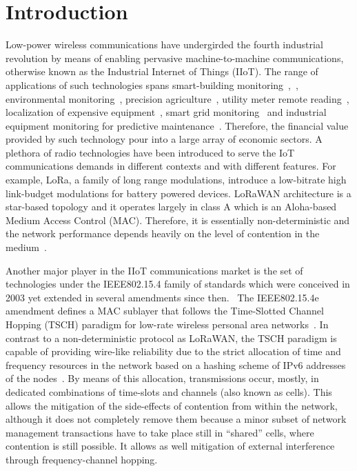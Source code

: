 \documentclass[sensors,article,submit,moreauthors,pdftex]{Definitions/mdpi}
\begin{document}
\section{Introduction}
\label{sec:introduction}


Low-power wireless communications have undergirded the fourth industrial revolution by means of enabling pervasive machine-to-machine communications, otherwise known as the Industrial Internet of Things (IIoT).
The range of applications of such technologies spans smart-building monitoring~\cite{munoz18overview},~\cite{kazmi14review}, environmental monitoring~\cite{munoz18evaluationa}, precision agriculture~\cite{watteyne16peach}, utility meter remote reading~\cite{sum17experimental}, localization of expensive equipment~\cite{tanaka20blink}, smart grid monitoring~\cite{fadel15survey} and industrial equipment monitoring for predictive maintenance~\cite{civerchia17industrial}.
Therefore, the financial value provided by such technology pour into a large array of economic sectors.
A plethora of radio technologies have been introduced to serve the IoT communications demands in different contexts and with different features.
For example, LoRa, a family of long range modulations, introduce a low-bitrate high link-budget modulations for battery powered devices.
LoRaWAN architecture is a star-based topology and it operates largely in class A which is an Aloha-based Medium Access Control (MAC).
Therefore, it is essentially non-deterministic and the network performance depends heavily on the level of contention in the medium~\cite{adelantado17understanding}.


Another major player in the IIoT communications market is the set of technologies under the IEEE802.15.4 family of standards which were conceived in 2003 yet extended in several amendments since then.~\cite{std_ieee802154}
The  IEEE802.15.4e amendment defines a MAC sublayer that follows the Time-Slotted Channel Hopping (TSCH) paradigm for low-rate wireless personal area networks~\cite{std_ieee802154}.
In contrast to a non-deterministic protocol as LoRaWAN, the TSCH paradigm is capable of providing wire-like reliability due to the strict allocation of time and frequency resources in the network based on a hashing scheme of IPv6 addresses of the nodes~\cite{draft-ietf-6tisch-msf}.
By means of this allocation, transmissions occur, mostly, in dedicated combinations of time-slots and channels (also known as cells).
This allows the mitigation of the side-effects of contention from within the network, although it does not completely remove them because a minor subset of network management transactions have to take place still in ``shared'' cells, where contention is still possible.
It allows as well mitigation of external interference through frequency-channel hopping.
\end{document}
